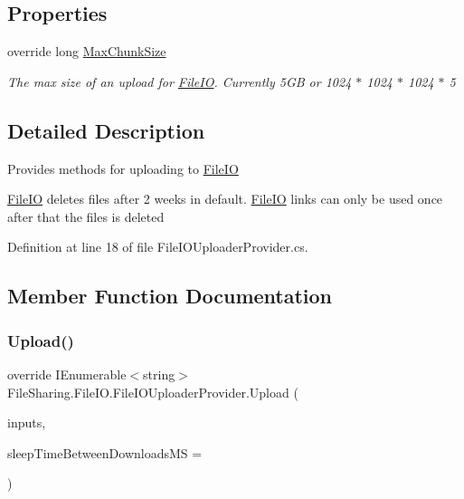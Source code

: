 \subsection*{Properties}
\begin{DoxyCompactItemize}
\item 
override long \hyperlink{class_file_sharing_1_1_file_i_o_1_1_file_i_o_uploader_provider_a71681d081bcdb7e871b4866c6a5c0c97}{Max\+Chunk\+Size}
\begin{DoxyCompactList}\small\item\em The max size of an upload for \hyperlink{namespace_file_sharing_1_1_file_i_o}{File\+IO}. Currently 5\+GB or 1024 $\ast$ 1024 $\ast$ 1024 $\ast$ 5 \end{DoxyCompactList}\end{DoxyCompactItemize}


\subsection{Detailed Description}
Provides methods for uploading to \hyperlink{namespace_file_sharing_1_1_file_i_o}{File\+IO} 

\hyperlink{namespace_file_sharing_1_1_file_i_o}{File\+IO} deletes files after 2 weeks in default. \hyperlink{namespace_file_sharing_1_1_file_i_o}{File\+IO} links can only be used once after that the files is deleted 

Definition at line 18 of file File\+I\+O\+Uploader\+Provider.\+cs.



\subsection{Member Function Documentation}
\mbox{\label{class_file_sharing_1_1_file_i_o_1_1_file_i_o_uploader_provider_adf0c3382f1c092923de4b2ee6a039923}} 
\subsubsection{\texorpdfstring{Upload()}{Upload()}\hspace{0.1cm}{\footnotesize\ttfamily [1/2]}}
{\footnotesize\ttfamily override I\+Enumerable$<$string$>$ File\+Sharing.\+File\+I\+O.\+File\+I\+O\+Uploader\+Provider.\+Upload (\begin{DoxyParamCaption}\item[{I\+Enumerable$<$ byte\mbox{[}$\,$\mbox{]}$>$}]{inputs,  }\item[{int}]{sleep\+Time\+Between\+Downloads\+MS = {} }\end{DoxyParamCaption})\hspace{0.3cm}{\ttfamily [virtual]}}



